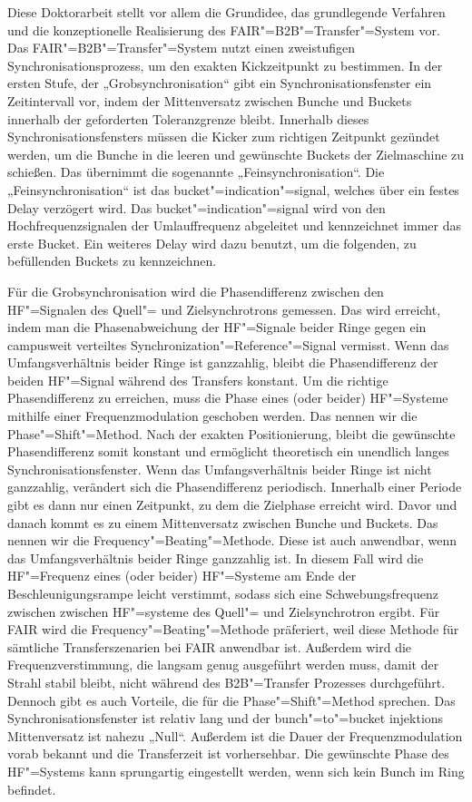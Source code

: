 Diese Doktorarbeit stellt vor allem die Grundidee, das grundlegende Verfahren und die konzeptionelle Realisierung des FAIR"=B2B"=Transfer"=System vor. Das FAIR"=B2B"=Transfer"=System nutzt einen zweistufigen Synchronisationsprozess, um den exakten Kickzeitpunkt zu bestimmen. In der ersten Stufe, der „Grobsynchronisation“ gibt ein Synchronisationsfenster ein Zeitintervall vor, indem der Mittenversatz zwischen Bunche und Buckets innerhalb der geforderten Toleranzgrenze bleibt. Innerhalb dieses Synchronisationsfensters m\"ussen die Kicker zum richtigen Zeitpunkt gez\"undet werden, um die Bunche in die leeren und gew\"unschte Buckets der Zielmaschine zu schie\ss{}en. Das \"ubernimmt die sogenannte „Feinsynchronisation“.
Die „Feinsynchronisation“ ist das bucket"=indication"=signal, welches \"uber ein festes Delay verz\"ogert wird. Das bucket"=indication"=signal wird von den Hochfrequenzsignalen der Umlauffrequenz abgeleitet und kennzeichnet immer das erste Bucket. Ein weiteres Delay wird dazu benutzt, um die folgenden, zu bef\"ullenden Buckets zu kennzeichnen. 

F\"ur die Grobsynchronisation wird die Phasendifferenz zwischen den HF"=Signalen des Quell"= und Zielsynchrotrons gemessen. Das wird erreicht, indem man die Phasenabweichung der HF"=Signale beider Ringe gegen ein campusweit verteiltes Synchronization"=Reference"=Signal vermisst. Wenn das Umfangsverh\"altnis  beider Ringe ist ganzzahlig, bleibt die Phasendifferenz der beiden HF"=Signal w\"ahrend des Transfers konstant. Um die richtige Phasendifferenz zu erreichen, muss die Phase eines (oder beider) HF"=Systeme mithilfe einer Frequenzmodulation geschoben werden. Das nennen wir die Phase"=Shift"=Method. Nach der exakten Positionierung, bleibt die gew\"unschte Phasendifferenz somit konstant und erm\"oglicht theoretisch ein unendlich langes Synchronisationsfenster. Wenn das Umfangsverh\"altnis beider Ringe ist nicht ganzzahlig, ver\"andert sich die Phasendifferenz periodisch. Innerhalb einer Periode gibt es dann nur einen Zeitpunkt, zu dem die Zielphase erreicht wird. Davor und danach kommt es zu einem Mittenversatz zwischen Bunche und Buckets. Das nennen wir die Frequency"=Beating"=Methode. Diese ist auch anwendbar, wenn das Umfangsverh\"altnis beider Ringe ganzzahlig ist. In diesem Fall wird die HF"=Frequenz eines (oder beider) HF"=Systeme am Ende der Beschleunigungsrampe leicht verstimmt, sodass sich eine Schwebungsfrequenz zwischen zwischen HF"=systeme des Quell"= und Zielsynchrotron ergibt. F\"ur FAIR wird die Frequency"=Beating"=Methode pr\"aferiert, weil diese Methode f\"ur s\"amtliche Transferszenarien bei FAIR anwendbar ist. Au\ss{}erdem wird die Frequenzverstimmung, die langsam genug ausgef\"uhrt werden muss, damit der Strahl stabil bleibt, nicht w\"ahrend des B2B"=Transfer Prozesses durchgef\"uhrt. Dennoch gibt es auch Vorteile, die f\"ur die Phase"=Shift"=Method sprechen. Das Synchronisationsfenster ist relativ lang und der bunch"=to"=bucket injektions Mittenversatz ist nahezu „Null“. Au\ss{}erdem ist die Dauer der Frequenzmodulation vorab bekannt und die Transferzeit ist vorhersehbar. Die gew\"unschte Phase des HF"=Systems kann sprungartig eingestellt werden, wenn sich kein Bunch im Ring befindet.

